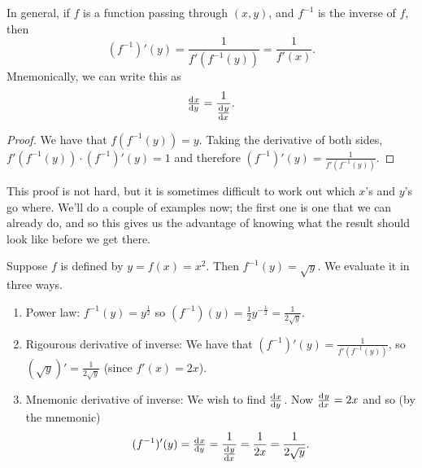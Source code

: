 \begin{thm}
  In general, if $ f $ is a function passing through $ (x,y) $, and $ f^{-1} $ is the inverse of $ f $, then
  \begin{displaymath}
    (f^{-1})'(y) = \frac{1}{f'(f^{-1}(y))} = \frac{1}{f'(x)}.
  \end{displaymath}
  Mnemonically, we can write this as
  \begin{displaymath}
    \od{x}{y} = \frac{1}{\od{y}{x}}.
  \end{displaymath}
\end{thm}
\begin{proof}
  We have that $ f(f^{-1}(y)) = y $. Taking the derivative of both sides, $ f'(f^{-1}(y)) \cdot (f^{-1})'(y) = 1 $
  and therefore $ (f^{-1})'(y) = \frac{1}{f'(f^{-1}(y))} $.
\end{proof}

This proof is not hard, but it is sometimes difficult to work out which $ x$'s and $ y$'s go where. We'll do a couple of examples now; the
first one is one that we can already do, and so this gives us the advantage of knowing what the result should look like before we get there.

\begin{ex}
  Suppose $ f $ is defined by $ y = f(x) = x^2 $. Then $ f^{-1}(y) = \sqrt{y} $. We evaluate it in three ways.
  \begin{enumerate}
    \item Power law: $ f^{-1}(y) = y^{\frac{1}{2}} $ so $ (f^{-1})(y) = \frac{1}{2} y^{-\frac{1}{2}} = \frac{1}{2\sqrt{y}} $.
    \item Rigourous derivative of inverse: We have that $ (f^{-1})'(y) = \frac{1}{f'(f^{-1}(y))} $, so $ (\sqrt{y})' = \frac{1}{2\sqrt{y}} $ (since $ f'(x) = 2x $).
    \item Mnemonic derivative of inverse:  We wish to find $ \od{x}{y} $. Now $ \od{y}{x} = 2x $ and so (by the mnemonic)
          \begin{displaymath}
            (f^{-1})'(y) = \od{x}{y} = \frac{1}{\od{y}{x}} = \frac{1}{2x} = \frac{1}{2\sqrt{y}}.
          \end{displaymath}
  \end{enumerate}
\end{ex}

